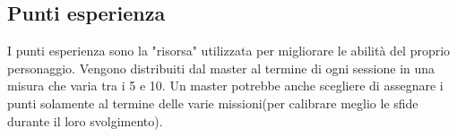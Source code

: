 \documentclass[../manuale_main.tex]{subfiles}
\begin{document}
\subsection{Punti esperienza}
I punti esperienza sono la "risorsa" utilizzata per migliorare le abilità del proprio personaggio. Vengono distribuiti dal master al termine di ogni sessione in una misura che varia tra i 5 e 10. Un master potrebbe anche scegliere di assegnare i punti solamente al termine delle varie missioni(per calibrare meglio le sfide durante il loro svolgimento).
\end{document}
